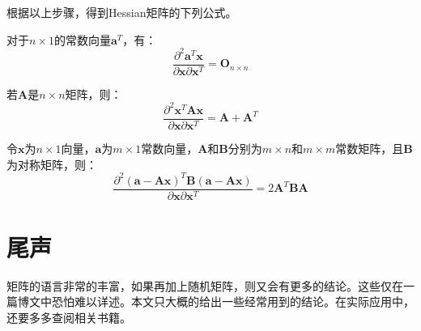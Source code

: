 \documentclass[10pt,a4paper,UTF8]{article}
\begin{document}
根据以上步骤，得到Hessian矩阵的下列公式。
\begin{tikzinstance}
对于\(n\times 1\)的常数向量\(\mathbf{a}^{T}\)，有：
\begin{equation}
\label{eq:47}
\frac{\partial^{2} \mathbf{a}^{T}\mathbf{x}}{\partial \mathbf{x}\partial \mathbf{x}^{T}} = \mathbf{O}_{n\times n}
\end{equation}
\end{tikzinstance}
\begin{tikzinstance}
若\(\mathbf{A}\)是\(n\times n\)矩阵，则：
\begin{equation}
\label{eq:48}
\frac{\partial^{2} \mathbf{x}^{T}\mathbf{A}\mathbf{x}}{\partial \mathbf{x}\partial \mathbf{x}^{T}} = \mathbf{A} + \mathbf{A}^{T}
\end{equation}
\end{tikzinstance}

\begin{tikzinstance}
令\(\mathbf{x}\)为\(n\times 1\)向量，\(\mathbf{a}\)为\(m\times 1\)常数向量，\(\mathbf{A}\)和\(\mathbf{B}\)分别为\(m\times n\)和\(m\times m\)常数矩阵，且\(\mathbf{B}\)为对称矩阵，则：
\begin{equation}
\label{eq:49}
\frac{\partial^{2}(\mathbf{a} - \mathbf{A}\mathbf{x})^{T}\mathbf{B} (\mathbf{a} - \mathbf{A}\mathbf{x}) }{\partial \mathbf{x} \partial \mathbf{x}^{T}} = 2\mathbf{A}^{T}\mathbf{B}\mathbf{A}
\end{equation}
\end{tikzinstance}
\section{尾声}
\label{sec:org9423f40}


矩阵的语言非常的丰富，如果再加上随机矩阵，则又会有更多的结论。这些仅在一篇博文中恐怕难以详述。本文只大概的给出一些经常用到的结论。在实际应用中，还要多多查阅相关书籍。
\end{document}
